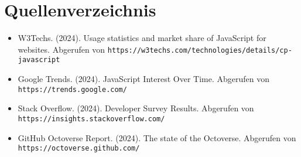 \documentclass[a4paper,12pt]{article}
\begin{document}
\section{Quellenverzeichnis}
\begin{itemize}
    \item W3Techs. (2024). Usage statistics and market share of JavaScript for websites. Abgerufen von \texttt{https://w3techs.com/technologies/details/cp-javascript}
    \item Google Trends. (2024). JavaScript Interest Over Time. Abgerufen von \texttt{https://trends.google.com/}
    \item Stack Overflow. (2024). Developer Survey Results. Abgerufen von \texttt{https://insights.stackoverflow.com/}
    \item GitHub Octoverse Report. (2024). The state of the Octoverse. Abgerufen von \texttt{https://octoverse.github.com/}
\end{itemize}
\end{document}

